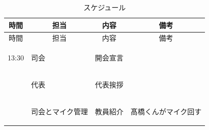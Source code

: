 \begin{longtable}[c]{|p{}|p{}|p{}|p{}|}
  \caption{スケジュール} \\
  \hline
  \multicolumn{1}{|c|}{時間} & \multicolumn{1}{c|}{担当} & \multicolumn{1}{c|}{内容} & \multicolumn{1}{c|}{備考} \\
  \hline
  \endfirsthead
  
  \hline
  \multicolumn{1}{|c|}{時間} & \multicolumn{1}{c|}{担当} & \multicolumn{1}{c|}{内容} & \multicolumn{1}{c|}{備考} \\
  \hline
  \endhead
  
  \hline
  \endfoot
  
  \hline
  \endlastfoot
  
  \begin{tpacol}
    13:30
  \end{tpacol}&
  \begin{tpbcol}
    司会
  \end{tpbcol}&
  \begin{tpccol}
    開会宣言
  \end{tpccol}&
  \begin{tpdcol}
  \end{tpdcol}\\

  \begin{tpacol}
    
  \end{tpacol}&
  \begin{tpbcol}
    代表
  \end{tpbcol}&
  \begin{tpccol}
    代表挨拶
  \end{tpccol}&
  \begin{tpdcol}
  \end{tpdcol}\\

  \begin{tpacol}
    
  \end{tpacol}&
  \begin{tpbcol}
    司会とマイク管理
  \end{tpbcol}&
  \begin{tpccol}
    教員紹介
  \end{tpccol}&
  \begin{tpdcol}
    髙橋くんがマイク回す
  \end{tpdcol}\\


\end{longtable}
\normalsize

